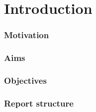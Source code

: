 
\part{Introduction}
\section{Motivation}
\section{Aims}
\section{Objectives}
\section{Report structure}
